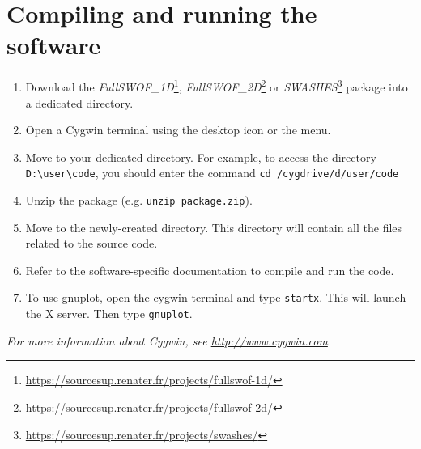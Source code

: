 \documentclass[a4paper, 11pt]{article}
\newcommand{\FullSWOFoneD}{\emph{FullSWOF\_1D}}
\newcommand{\FullSWOFtwoD}{\emph{FullSWOF\_2D}}
\newcommand{\SWASHES}{\emph{SWASHES}}
\newcommand{\MainWebSiteFSoneD}{\url{https://sourcesup.renater.fr/projects/fullswof-1d/}}
\newcommand{\MainWebSiteFStwoD}{\url{https://sourcesup.renater.fr/projects/fullswof-2d/}}
\newcommand{\MainWebSiteSWASHES}{\url{https://sourcesup.renater.fr/projects/swashes/}}
\begin{document}
\section{Compiling and running the software}

\begin{enumerate}
\item Download the \FullSWOFoneD\footnote{\MainWebSiteFSoneD}, \FullSWOFtwoD{}\footnote{\MainWebSiteFStwoD} or \SWASHES{}\footnote{\MainWebSiteSWASHES} package into a dedicated directory.
\item Open a Cygwin terminal using the desktop icon or the menu.
\item Move to your dedicated directory. For example, to access the directory \verb!D:\user\code!, you should enter the command \verb!cd /cygdrive/d/user/code!
\item Unzip the package (e.g. \verb!unzip package.zip!).
\item Move to the newly-created directory. This directory will contain all the files related to the source code.
\item Refer to the software-specific documentation to compile and run the code.
\item To use gnuplot, open the cygwin terminal and type \verb!startx!. This will launch the X server. Then type \verb!gnuplot!.
\end{enumerate}

\emph{For more information about Cygwin, see \url{http://www.cygwin.com}}
\end{document}
